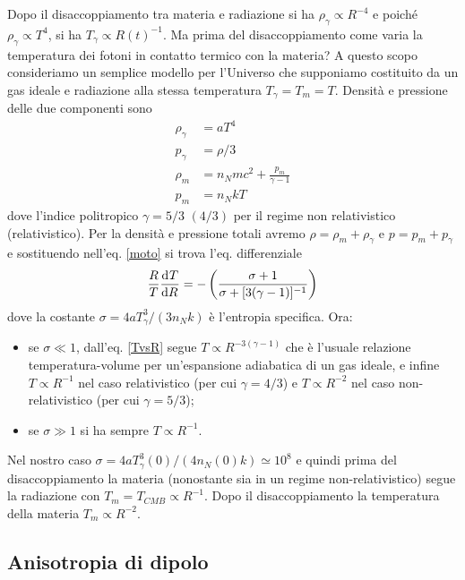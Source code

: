 Dopo il disaccoppiamento tra materia e radiazione si ha $\rho_{\gamma} \propto
R^{-4}$ e poiché $\rho_{\gamma} \propto T^4$, si ha $T_{\gamma} \propto
R(t)^{-1}$.  Ma prima del disaccoppiamento come varia la temperatura dei fotoni
in contatto termico con la materia?  A questo scopo consideriamo un semplice
modello per l'Universo che supponiamo costituito da un gas ideale e radiazione
alla stessa temperatura $T_{\gamma}=T_{m}=T$. Densità e pressione delle due
componenti sono
\begin{subequations}
  \begin{align}
    \rho_{\gamma} & = a T^4 \\
    p_{\gamma} &=\rho/3  \\
    \rho_{m}    & = n_N m c^2 + \frac{p_{m}}{\gamma-1} \\
    p_m &=n_N kT
  \end{align}
\end{subequations}
dove l'indice politropico $\gamma=5/3$ $(4/3)$ per il regime non relativistico
(relativistico).  Per la densità e pressione totali avremo $\rho =
\rho_{m}+\rho_{\gamma}$ e $p=p_{m}+p_{\gamma}$ e sostituendo
nell'eq. \eqref{moto} si trova l'eq. differenziale
\begin{equation}
  \label{TvsR}
  \frac{R}{T} \frac{{\mathop{}\!\mathrm{d}^{}}T}{\mathop{}\!\mathrm{d} {R}^{}} = -
  \left(\frac{\sigma+1}{\sigma+[3(\gamma-1)]^{-1}}\right)
\end{equation}
dove la costante $\sigma = 4 a T^3_{\gamma}/(3 n_N k)$ è l'entropia specifica.  Ora:
\begin{itemize}
\item se $\sigma \ll 1$, dall'eq. \eqref{TvsR} segue $T \propto
  R^{-3(\gamma-1)}$ che è l'usuale relazione temperatura-volume per
  un'espansione adiabatica di un gas ideale, e infine
  $T \propto R^{-1}$ nel caso relativistico (per cui $\gamma=4/3$)
e $ T \propto R^{-2}$ nel caso non-relativistico (per cui $\gamma=5/3$);
\item se $\sigma \gg 1$ si ha sempre $T \propto R^{-1}$.
\end{itemize}

Nel nostro caso $\sigma = 4 a T^3_{\gamma}(0)/(4 n_N(0) k) \simeq 10^8$ e quindi
prima del disaccoppiamento la materia (nonostante sia in un regime
non-relativistico) segue la radiazione con $T_m=T_{CMB} \propto R^{-1}$.  Dopo
il disaccoppiamento la temperatura della materia $T_{m}\propto R^{-2}$.

\subsection{Anisotropia di dipolo}

